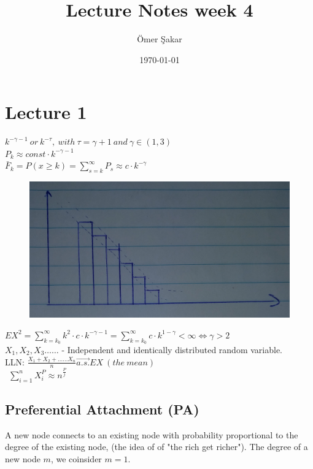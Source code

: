 \documentclass[12pt]{scrartcl}
\title{Lecture Notes week 4}
\author{\"Omer \c Sakar}
\date{\today}
\begin{document}
\maketitle
\tableofcontents
\newpage

\section{Lecture 1}
$k^{-\gamma - 1}\ or\ k^{-\tau},\ with\ \tau = \gamma + 1\ and\ \gamma \in (1,3)$\\
$P_{k} \approx const\cdot k^{-\gamma - 1}$\\
$\bar{F}_{k} = P(x \geq k) = \sum\limits_{s=k}^\infty P_{s} \approx c\cdot k^{-\gamma}$



\begin{figure}[h]
	\centering
	\includegraphics[width=\textwidth]{./images/fig_1.jpg}
\end{figure}

\noindent $EX^{2} = \sum\limits_{k=k_{0}}^\infty k^{2}\cdot c\cdot k^{-\gamma-1} = \sum\limits_{k=k_{0}}^\infty c\cdot k^{1 - \gamma} < \infty \iff \gamma > 2$\\



\noindent $X_{1},X_{2},X_{3}\dotsc \dotsc$ - Independent and identically distributed random variable.\\
LLN: $\frac{X_{1} + X_{2} + \dotsc \dotsc X_{n}}{n} \stackrel{\rightarrow}{a.s.} EX\ (the\ mean)$\\
\indent \indent$\ \ \sum\limits_{i=1}^n X_{i}^{P} \approx n^{\frac{P}{j}}$



\subsection{Preferential Attachment (PA)}
A new node connects to an existing node with probability proportional to the degree of the existing node, (the idea of of "the rich get richer").
The degree of a new node $m$, we coinsider $m=1$.
\end{document}
